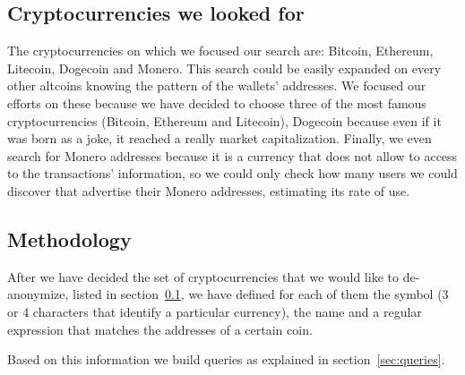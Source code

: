 \subsection{Cryptocurrencies we looked for}
\label{subsec:currencies}
The cryptocurrencies on which we focused our search are: Bitcoin, Ethereum,
Litecoin, Dogecoin and Monero. This search could be easily expanded on every
other altcoins knowing the pattern of the wallets' addresses. We focused our
efforts on these because we have decided to choose three of the most famous
cryptocurrencies (Bitcoin, Ethereum and Litecoin), Dogecoin because even if
it was born as a joke, it reached a really market capitalization. Finally, we even
search for Monero addresses because it is a currency that does not allow to
access to the transactions' information, so we could only check how many users we could
discover that advertise their Monero addresses, estimating its rate of use. 
\subsection{Methodology}
\label{sec:methodology}
After we have decided the set of cryptocurrencies that we would like to
de-anonymize, listed in section~\ref{subsec:currencies}, we have defined for
each of them the symbol (3 or 4 characters that identify a particular
currency), the name and a regular expression that matches the addresses of a
certain coin.

Based on this information we build queries as explained in
section~\ref{sec:queries}.
